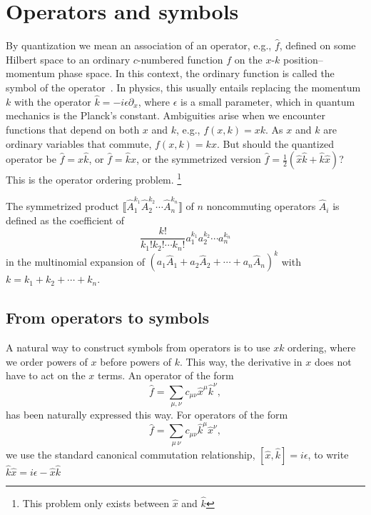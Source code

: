 
\section{Operators and symbols}

By quantization we mean an association of an operator, e.g., $\hat{f}$, defined on some Hilbert space to an ordinary $c$-numbered function $f$ on the $x$-$k$ position--momentum phase space.
In this context, the ordinary function is called the symbol of the operator~\cite[\S 2.3.1]{chaichian2001}.
In physics, this usually entails replacing the momentum $k$ with the operator $\hat{k} = -i\epsilon\partial_{x}$, where $\epsilon$ is a small parameter, which in quantum mechanics is the Planck's constant.
Ambiguities arise when we encounter functions that depend on both $x$ and $k$, e.g., $f(x, k) = xk$.
As $x$ and $k$ are ordinary variables that commute, $f(x, k) = kx$.
But should the quantized operator be $\hat{f} = x\hat{k}$, or $\hat{f} = \hat{k}x$, or the symmetrized version $\hat{f} = \frac{1}{2}\left(\hat{x}\hat{k} + \hat{k}\hat{x}\right)$?
This is the operator ordering problem.%
\footnote{This problem only exists between $\hat{x}$ and $\hat{k}$ }

The symmetrized product $\big\llbracket \widehat{A}_{1}^{k_{1}} \widehat{A}_{2}^{k_{2}} \cdots \widehat{A}_{n}^{k_n} \big\rrbracket$ of $n$ noncommuting operators $\widehat{A}_{i}$ is defined as the coefficient of
%
\begin{equation}
  \frac{k!}{k_{1}!k_{2}!\cdots k_{n}!} a_{1}^{k_{1}} a_{2}^{k_{2}} \cdots a_{n}^{k_{n}}
\end{equation}
%
in the multinomial expansion of $\left(a_{1}\widehat{A}_{1} + a_{2}\widehat{A}_{2} + \cdots + a_{n}\widehat{A}_{n}\right)^{k}$ with $k = k_{1} + k_{2} + \cdots + k_{n}$.

\subsection{From operators to symbols}

A natural way to construct symbols from operators is to use $xk$ ordering, where we order powers of $x$ before powers of $k$.
This way, the derivative in $x$ does not have to act on the $x$ terms.
An operator of the form 
%
\begin{equation}
  \hat{f} = \sum_{\mu,\nu} c_{\mu\nu} \hat{x}^{\mu}\hat{k}^{\nu},
\end{equation}
%
has been naturally expressed this way.
For operators of the form
%
\begin{equation}
  \hat{f} = \sum_{\mu\,\nu} c_{\mu\nu} \hat{k}^{\mu}\hat{x}^{\nu},
\end{equation}
%
we use the standard canonical commutation relationship, $[\hat{x}, \hat{k}] = i\epsilon$, to write $\hat{k}\hat{x} = i\epsilon - \hat{x}\hat{k}$


